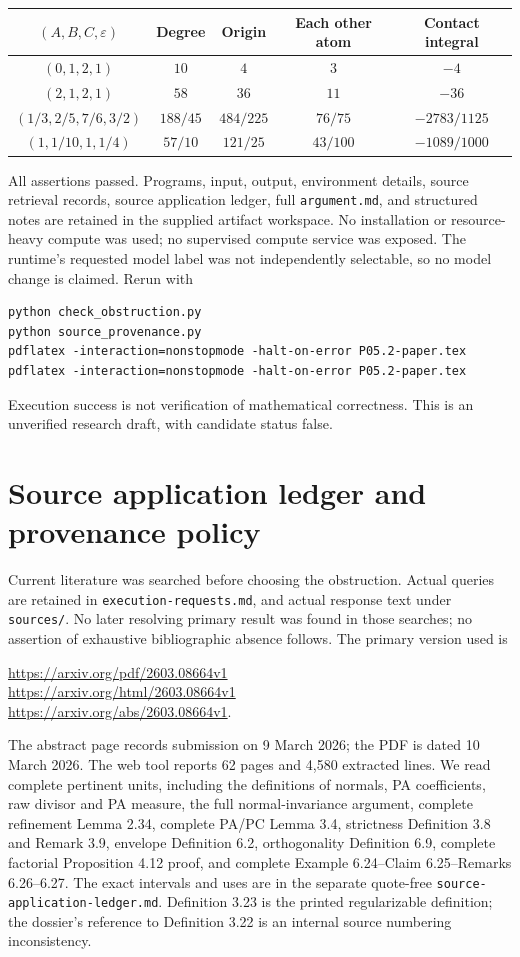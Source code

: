 \documentclass[11pt]{article}
\newcommand{\eps}{\varepsilon}
\begin{document}
\begin{center}\small
\begin{tabular}{ccccc}\toprule
$(A,B,C,\eps)$&Degree&Origin&Each other atom&Contact integral\\\midrule
$(0,1,2,1)$&$10$&$4$&$3$&$-4$\\
$(2,1,2,1)$&$58$&$36$&$11$&$-36$\\
$(1/3,2/5,7/6,3/2)$&$188/45$&$484/225$&$76/75$&$-2783/1125$\\
$(1,1/10,1,1/4)$&$57/10$&$121/25$&$43/100$&$-1089/1000$\\\bottomrule
\end{tabular}
\end{center}
All assertions passed. Programs, input, output, environment details, source retrieval records, source application ledger, full \texttt{argument.md}, and structured notes are retained in the supplied artifact workspace. No installation or resource-heavy compute was used; no supervised compute service was exposed. The runtime's requested model label was not independently selectable, so no model change is claimed. Rerun with
\begin{verbatim}
python check_obstruction.py
python source_provenance.py
pdflatex -interaction=nonstopmode -halt-on-error P05.2-paper.tex
pdflatex -interaction=nonstopmode -halt-on-error P05.2-paper.tex
\end{verbatim}
Execution success is not verification of mathematical correctness. This is an unverified research draft, with candidate status false.

\appendix
\section{Source application ledger and provenance policy}
Current literature was searched before choosing the obstruction. Actual queries are retained in \nolinkurl{execution-requests.md}, and actual response text under \texttt{sources/}. No later resolving primary result was found in those searches; no assertion of exhaustive bibliographic absence follows. The primary version used is
\begin{center}\small
\url{https://arxiv.org/pdf/2603.08664v1}\\
\url{https://arxiv.org/html/2603.08664v1}\\
\url{https://arxiv.org/abs/2603.08664v1}.
\end{center}
The abstract page records submission on 9 March 2026; the PDF is dated 10 March 2026. The web tool reports 62 pages and 4,580 extracted lines. We read complete pertinent units, including the definitions of normals, PA coefficients, raw divisor and PA measure, the full normal-invariance argument, complete refinement Lemma 2.34, complete PA/PC Lemma 3.4, strictness Definition 3.8 and Remark 3.9, envelope Definition 6.2, orthogonality Definition 6.9, complete factorial Proposition 4.12 proof, and complete Example 6.24--Claim 6.25--Remarks 6.26--6.27. The exact intervals and uses are in the separate quote-free \texttt{source-application-ledger.md}. Definition 3.23 is the printed regularizable definition; the dossier's reference to Definition 3.22 is an internal source numbering inconsistency.
\end{document}
